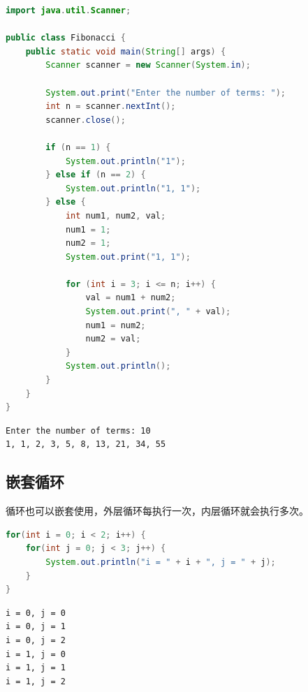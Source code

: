\begin{lstlisting}[language=Java]
import java.util.Scanner;

public class Fibonacci {
    public static void main(String[] args) {
        Scanner scanner = new Scanner(System.in);

        System.out.print("Enter the number of terms: ");
        int n = scanner.nextInt();
        scanner.close();

        if (n == 1) {
            System.out.println("1");
        } else if (n == 2) {
            System.out.println("1, 1");
        } else {
            int num1, num2, val;
            num1 = 1;
            num2 = 1;
            System.out.print("1, 1");

            for (int i = 3; i <= n; i++) {
                val = num1 + num2;
                System.out.print(", " + val);
                num1 = num2;
                num2 = val;
            }
            System.out.println();
        }
    }
}
\end{lstlisting}

\begin{tcolorbox}
    \begin{verbatim}
Enter the number of terms: 10
1, 1, 2, 3, 5, 8, 13, 21, 34, 55
\end{verbatim}
\end{tcolorbox}

\vspace{0.5cm}

\subsection{嵌套循环}

循环也可以嵌套使用，外层循环每执行一次，内层循环就会执行多次。

\vspace{-0.5cm}

\begin{lstlisting}[language=Java]
for(int i = 0; i < 2; i++) {
    for(int j = 0; j < 3; j++) {
        System.out.println("i = " + i + ", j = " + j);
    }
}
\end{lstlisting}

\begin{tcolorbox}
    \begin{verbatim}
i = 0, j = 0
i = 0, j = 1
i = 0, j = 2
i = 1, j = 0
i = 1, j = 1
i = 1, j = 2
\end{verbatim}
\end{tcolorbox}

